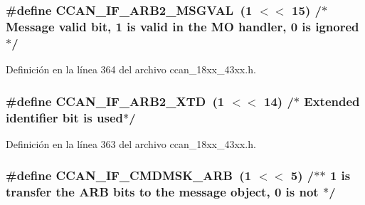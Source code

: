\subsubsection[{\texorpdfstring{C\+C\+A\+N\+\_\+\+I\+F\+\_\+\+A\+R\+B2\+\_\+\+M\+S\+G\+V\+AL}{CCAN_IF_ARB2_MSGVAL}}]{\setlength{\rightskip}{0pt plus 5cm}\#define C\+C\+A\+N\+\_\+\+I\+F\+\_\+\+A\+R\+B2\+\_\+\+M\+S\+G\+V\+AL~(1 $<$$<$ 15)		/$\ast$ Message valid bit, 1 is valid in the MO handler, 0 is ignored $\ast$/}\hypertarget{group___c_c_a_n__18_x_x__43_x_x_ga11ed203f0f2890790f98a3a03f411755}{}\label{group___c_c_a_n__18_x_x__43_x_x_ga11ed203f0f2890790f98a3a03f411755}


Definición en la línea 364 del archivo ccan\+\_\+18xx\+\_\+43xx.\+h.

\subsubsection[{\texorpdfstring{C\+C\+A\+N\+\_\+\+I\+F\+\_\+\+A\+R\+B2\+\_\+\+X\+TD}{CCAN_IF_ARB2_XTD}}]{\setlength{\rightskip}{0pt plus 5cm}\#define C\+C\+A\+N\+\_\+\+I\+F\+\_\+\+A\+R\+B2\+\_\+\+X\+TD~(1 $<$$<$ 14)		/$\ast$ Extended identifier bit is used$\ast$/}\hypertarget{group___c_c_a_n__18_x_x__43_x_x_ga5da2db0d7aa00bea000fe1fb0be9c3ff}{}\label{group___c_c_a_n__18_x_x__43_x_x_ga5da2db0d7aa00bea000fe1fb0be9c3ff}


Definición en la línea 363 del archivo ccan\+\_\+18xx\+\_\+43xx.\+h.

\subsubsection[{\texorpdfstring{C\+C\+A\+N\+\_\+\+I\+F\+\_\+\+C\+M\+D\+M\+S\+K\+\_\+\+A\+RB}{CCAN_IF_CMDMSK_ARB}}]{\setlength{\rightskip}{0pt plus 5cm}\#define C\+C\+A\+N\+\_\+\+I\+F\+\_\+\+C\+M\+D\+M\+S\+K\+\_\+\+A\+RB~(1 $<$$<$ 5)		/$\ast$$\ast$ 1 is transfer the A\+RB bits to the message object, 0 is not $\ast$/}\hypertarget{group___c_c_a_n__18_x_x__43_x_x_ga568752f6d7905cff72c156242b34f381}{}\label{group___c_c_a_n__18_x_x__43_x_x_ga568752f6d7905cff72c156242b34f381}


